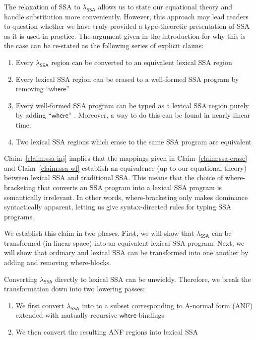 \documentclass[acmsmall,screen,review]{acmart}
\newcommand{\ms}[1]{\ensuremath{\mathsf{#1}}}
\newcommand{\isotopessa}{\(\lambda_{\ms{SSA}}\)}
\begin{document}
The relaxation of SSA to \isotopessa{} allows us to state our equational theory and handle
substitution more conveniently. However, this approach may lead readers to question whether we have
truly provided a type-theoretic presentation of SSA as it is used in practice. The argument given in
the introduction for why this is the case can be re-stated as the following series of explicit
claims:
\begin{enumerate}
  \item Every \isotopessa{} region can be converted to an equivalent lexical SSA region
  \label{claim:ssa-conv}
  \item \label{claim:ssa-erase} Every lexical SSA region can be erased to a well-formed SSA program
    by removing ``\ms{where}'' 
  \item Every well-formed SSA program can be typed as a lexical SSA region purely by adding
  ``\ms{where}'' \label{claim:ssa-wf}. Moreover, a way to do this can be found in nearly linear
  time.
  \item Two lexical SSA regions which erase to the same SSA program are equivalent
    \label{claim:ssa-inj}
\end{enumerate}
Claim~\ref{claim:ssa-inj} implies that the mappings given in Claim~\ref{claim:ssa-erase} and
Claim~\ref{claim:ssa-wf} establish an equivalence (up to our equational theory) between lexical SSA
and traditional SSA.
This means that the choice of where-bracketing that converts an SSA program into a lexical
SSA program is semantically irrelevant. In other words, where-bracketing only makes dominance
syntactically apparent, letting us give syntax-directed rules for typing SSA programs. 

We establish this claim in two phases. First, we will show that \isotopessa{} can be transformed
(in linear space) into an equivalent lexical SSA program. Next, we will show that ordinary and lexical
SSA can be transformed into one another by adding and removing where-blocks. 


Converting \isotopessa{} directly to lexical SSA can be unwieldy. Therefore, we break the transformation down into
two lowering passes: 
\begin{enumerate}
  \item We first convert \isotopessa{} into to a subset corresponding to A-normal form (ANF)
extended with mutually recursive \ms{where}-bindings
  \item We then convert the resulting ANF regions into lexical SSA
\end{enumerate}
\end{document}
